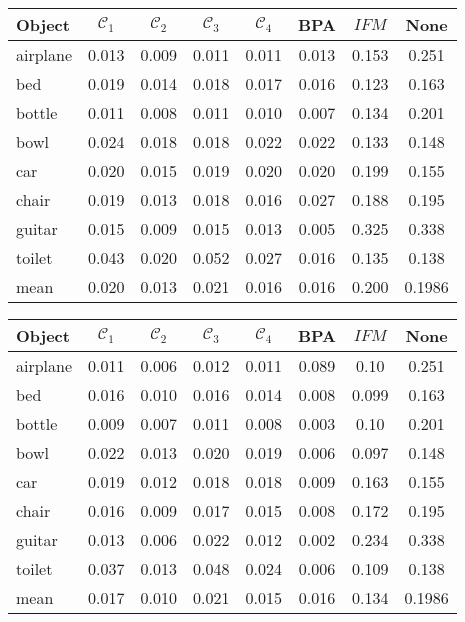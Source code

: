 \begin{center}
     \label{tab:distance256} 
    \begin{tabular}{| l  | c  | c | c | c | c | c || c |}
        \hline
        Object& $\mathcal{C}_1$ & $\mathcal{C}_2$ & $\mathcal{C}_3$ & $\mathcal{C}_4$ & BPA & $IFM$  & None\\ \hline
        airplane&0.013&0.009&0.011&0.011&0.013&0.153&0.251\\\hline
        bed&0.019&0.014&0.018&0.017&0.016&0.123&0.163\\\hline 
        bottle&0.011&0.008&0.011&0.010&0.007&0.134&0.201\\\hline
        bowl&0.024&0.018&0.018&0.022&0.022&0.133&0.148\\\hline
        car&0.020&0.015&0.019&0.020&0.020&0.199&0.155\\\hline
        chair&0.019&0.013&0.018&0.016&0.027&0.188&0.195\\\hline
        guitar&0.015&0.009&0.015&0.013&0.005&0.325&0.338\\\hline
        toilet&0.043&0.020&0.052&0.027&0.016&0.135&0.138\\\hline\hline
        mean&0.020&0.013&0.021&0.016&0.016&0.200&0.1986\\\hline
    \end{tabular}
\end{center}
\begin{center}
     \label{tab:distance1024} 
    \begin{tabular}{| l  | c | c | c | c | c | c || c |}
        \hline
        Object& $\mathcal{C}_1$ & $\mathcal{C}_2$ & $\mathcal{C}_3$ & $\mathcal{C}_4$ & BPA & $IFM$ & None\\ \hline
        airplane&0.011&0.006&0.012&0.011&0.089&0.10 & 0.251\\\hline
        bed&0.016&0.010&0.016&0.014&0.008&0.099 & 0.163\\        \hline
        bottle&0.009&0.007&0.011&0.008&0.003&0.10 & 0.201\\        \hline
        bowl&0.022&0.013&0.020&0.019&0.006&0.097& 0.148\\        \hline
        car&0.019&0.012&0.018&0.018&0.009&0.163& 0.155\\        \hline
        chair&0.016&0.009&0.017&0.015&0.008&0.172& 0.195\\        \hline
        guitar&0.013&0.006&0.022&0.012&0.002&0.234 & 0.338\\        \hline
        toilet&0.037&0.013&0.048&0.024&0.006&0.109 & 0.138\\        \hline\hline
        mean&0.017&0.010&0.021&0.015&0.016&0.134 & 0.1986\\        \hline
    \end{tabular}
\end{center}
